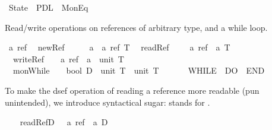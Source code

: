 %
\begin{isabellebody}%
\def\isabellecontext{State}%
%
\isamarkuptrue%
\ State\ {\isacharequal}\ PDL\ {\isacharplus}\ MonEq{\isacharcolon}\isamarkupfalse%
%
\label{sec:state-thy}
%
\begin{isamarkuptext}%
Read/write operations on references of arbitrary type, and a while loop.
  \label{isa:ref-spec}%
\end{isamarkuptext}%
\isamarkuptrue%
\ {\isacharprime}a\ ref\isanewline
\isanewline
\isamarkupfalse%
\isanewline
\ \ newRef\ \ \ \ \ {\isacharcolon}{\isacharcolon}\ {\isachardoublequote}{\isacharprime}a\ {\isasymRightarrow}\ {\isacharprime}a\ ref\ T{\isachardoublequote}\isanewline
\ \ readRef\ \ \ \ {\isacharcolon}{\isacharcolon}\ {\isachardoublequote}{\isacharprime}a\ ref\ {\isasymRightarrow}\ {\isacharprime}a\ T{\isachardoublequote}\ \ \ \ \ \ \ \ \ \ \ \ \ \ \ \isanewline
\ \ writeRef\ \ \ {\isacharcolon}{\isacharcolon}\ {\isachardoublequote}{\isacharprime}a\ ref\ {\isasymRightarrow}\ {\isacharprime}a\ {\isasymRightarrow}\ unit\ T{\isachardoublequote}\ \ \ \ \ \ \ \ \ \ \ {\isacharparenleft}{\isachardoublequote}{\isacharparenleft}{\isacharunderscore}\ {\isacharcolon}{\isacharequal}\ {\isacharunderscore}{\isacharparenright}{\isachardoublequote}\ {\isacharbrackleft}{}{}{}{\isacharcomma}\ {}{}{\isacharbrackright}\ {}{}{\isacharparenright}\isanewline
\ \ monWhile\ \ \ {\isacharcolon}{\isacharcolon}\ {\isachardoublequote}bool\ D\ {\isasymRightarrow}\ unit\ T\ {\isasymRightarrow}\ unit\ T{\isachardoublequote}\ \ \ \ \ \ \ {\isacharparenleft}{\isachardoublequote}WHILE\ {\isacharparenleft}{}{\isacharunderscore}{\isacharparenright}\ {\isacharslash}DO\ {\isacharparenleft}{}{\isacharunderscore}{\isacharparenright}\ {\isacharslash}END{\isachardoublequote}{\isacharparenright}\isamarkupfalse%
%
\begin{isamarkuptext}%
To make the dsef operation of reading a reference more readable (pun unintended),
  we introduce syntactical sugar:  stands for .%
\end{isamarkuptext}%
\isamarkuptrue%
\ \isanewline
\ \ {\isachardoublequote}{\isacharunderscore}readRefD{\isachardoublequote}\ \ {\isacharcolon}{\isacharcolon}\ {\isachardoublequote}{\isacharprime}a\ ref\ {\isasymRightarrow}\ {\isacharprime}a\ D{\isachardoublequote}\ \ \ \ \ \ \ \ \ \ \ \ \ \ \ \ {\isacharparenleft}{\isachardoublequote}{\isacharasterisk}{\isacharunderscore}{\isachardoublequote}\ {\isacharbrackleft}{}{}{}{\isacharbrackright}\ {}{}{}{\isacharparenright}\isanewline

\end{isabellebody}
